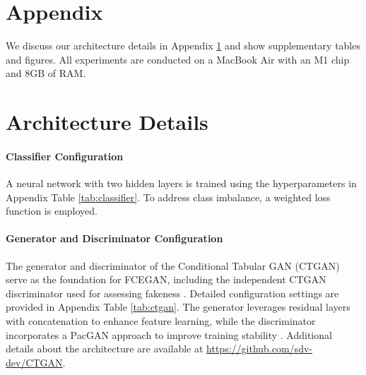 \documentclass[runningheads]{llncs}
\begin{document}



\setcounter{figure}{0}
\renewcommand{\thefigure}{A\arabic{figure}}

\setcounter{table}{0}
\renewcommand{\thetable}{A\arabic{table}}

\clearpage
\appendix
\section*{Appendix}
\label{sec:appendix}

We discuss our architecture details in Appendix \ref{subsec:architecture details} and show supplementary tables and figures. All experiments are conducted on a MacBook Air with an M1 chip and 8GB of RAM.

\setcounter{secnumdepth}{2}

\setcounter{table}{0}
\renewcommand{\thetable}{B\arabic{table}}

\setcounter{figure}{0}
\renewcommand{\thefigure}{C\arabic{figure}}

\section{Architecture Details}
\label{subsec:architecture details}
\paragraph{Classifier Configuration}
A neural network with two hidden layers is trained using the hyperparameters in Appendix Table \ref{tab:classifier}. To address class imbalance, a weighted loss function is employed.

\paragraph{Generator and Discriminator Configuration}
The generator and discriminator of the Conditional Tabular GAN (CTGAN) serve as the foundation for FCEGAN, including the independent CTGAN discriminator used for assessing fakeness \cite{xu_modeling_2019}. Detailed configuration settings are provided in Appendix Table \ref{tab:ctgan}. The generator leverages residual layers with concatenation to enhance feature learning, while the discriminator incorporates a PacGAN approach to improve training stability \cite{lin_pacgan_2018}. Additional details about the architecture are available at \url{https://github.com/sdv-dev/CTGAN}.
\end{document}
